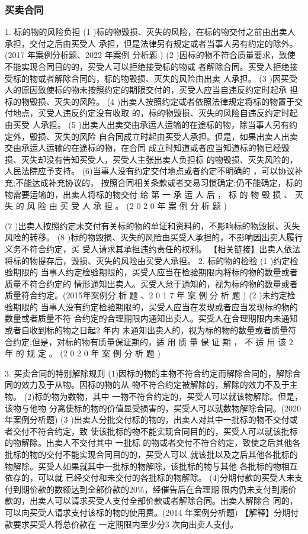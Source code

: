 \documentclass[UTF8,12pt]{ctexart}
\numberwithin{equation}{section} %
\numberwithin{figure}{section}
\numberwithin{table}{section}
\begin{document}
	\subsubsection{买卖合同}
	1. 标的物的风险负担
	(1 )标的物毁损、灭失的风险，在标的物交付之前由出卖人承担，交付之后由买受人
	承担，但是法律另有规定或者当事人另有约定的除外。(2017 年案例分析题、2022 年案例 分析题 )
	(2 )因标的物不符合质量要求，致使不能实现合同目的的，买受人可以拒绝接受标的物或 者解除合同。买受人拒绝接受标的物或者解除合同的，标的物毁损、灭失的风险由出卖 人承担。
	(3 )因买受人的原因致使标的物未按照约定的期限交付的，买受人应当自违反约定时起承 担标的物毁损、灭失的风险。
	(4 )出卖人按照约定或者依照法律规定将标的物置于交付地点，买受人违反约定没有收取 的，标的物毁损、灭失的风险自违反约定时起由买受 人承担。
	(5 )出卖人出卖交由承运人运输的在途标的物，除当事人另有约定外，毁损、灭失的风险 自合同成立时起由买受人承担。但是，如果出卖人出卖交由承运人运输的在途标的物，在合同 成立时知道或者应当知道标的物已经毁损、灭失却没有告知买受人，买受人主张出卖人负担标
	的物毁损、灭失风险的，人民法院应予支持。 (6)当事人没有约定交付地点或者约定不明确的 ，可以协议补充;不能达成补充协议的，
	按照合同相关条款或者交易习惯确定;仍不能确定，标的物需要运输的，出卖人将标的物交付 给 第 一 承 运 人 后 ， 标 的 物 毁 损 、 灭 失 的 风 险 由 买 受 人 承 担 。 (2 0 2 0 年 案 例 分 析 题 )
	
	(7 )出卖人按照约定未交付有关标的物的单证和资料的，不影响标的物毁损、灭失风险的转移。 (8 )标的物毁损、灭失的风险由买受人承担的，不影响因出卖人履行义务不符合约定，买 受人请求其承担违约责任的权利。
	【相关链接】出卖人依法将标的物提存后，毁损、灭失的风险由买受人承担。
	2. 标的物的检验
	(1 )约定检验期限的 当事人约定检验期限的，买受人应当在检验期限内将标的物的数量或者质量不符合约定的 情形通知出卖人。买受人怠于通知的，视为标的物的数量或者质量符合约定。(2015年案例分 析 题 、2 0 1 7 年 案 例 分 析 题 )
	(2 )未约定检验期限的 当事人没有约定检验期限的，买受人应当在发现或者应当发现标的物的数量或者质量不符 合约定的合理期限内通知出卖人。买受人在合理期限内未通知或者自收到标的物之日起2 年内 未通知出卖人的，视为标的物的数量或者质量符合约定;但是，对标的物有质量保证期的，适 用 质 量 保 证 期 ， 不 适 用 该 2 年 的 规 定 。 (2 0 2 0 年 案 例 分 析 题 )
	
	
	3. 买卖合同的特别解除规则 (1)因标的物的主物不符合约定而解除合同的，解除合同的效力及于从物。因标的物的从 物不符合约定被解除的，解除的效力不及于主物。
	(2)标的物为数物，其中 一物不符合约定的，买受人可以就该物解除。但是，该物与他物 分离使标的物的价值显受损害的，买受人可以就数物解除合同。(2020 年案例分析题)
	(3 )出卖人分批交付标的物的，出卖人对其中一批标的物不交付或者交付不符合约定，致 使该批标的物不能实现合同目的的，买受人可以就该批标的物解除。出卖人不交付其中 一批标 的物或者交付不符合约定，致使之后其他各批标的物的交付不能实现合同目的的，买受人可以 就该批以及之后其他各批标的物解除。买受人如果就其中一批标的物解除，该批标的物与其他 各批标的物相互依存的，可以就 已经交付和未交付的各批标的物解除。 (4)分期付款的买受人未支付到期价款的数额达到全部价款的20\%，经催告后在合理期 限内仍未支付到期价款的，出卖人可以请求买受人支付全部价款或者解除合同。出卖人解除合 同的，可以向买受人请求支付该标的物的使用费。(2014 年案例分析题)
	【解释】分期付款要求买受人将总价款在 一定期限内至少分3 次向出卖人支付。
	
\end{document}
